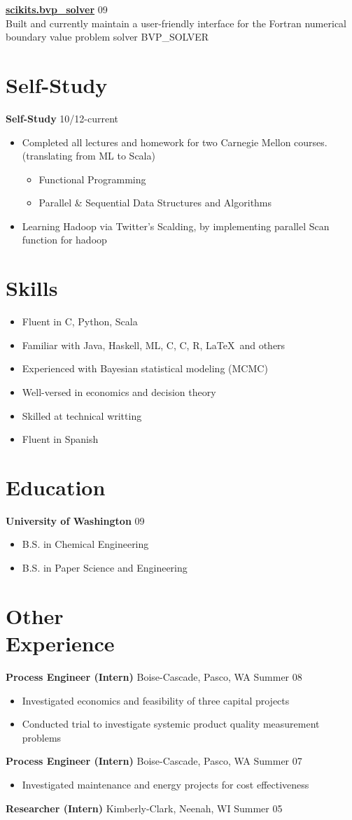 \documentclass[margin]{res}
\newcommand{\bactivity}[3]{
  {\bf #1} #2 \hfill #3
    \vspace{6pt}
    \begin{itemize} \itemsep -2pt
      }
\newcommand{\eactivity}[0]{\end{itemize}}
\newcommand{\bitem}{\begin{itemize} \itemsep -2pt}
\newcommand{\eitem}{\end{itemize} }
\newcommand{\CPP}
{C\nolinebreak[4]\hspace{-.05em}\raisebox{.22ex}{\footnotesize\bf ++}}
\newcommand{\CS}
{C\nolinebreak[4]\hspace{-.05em}\raisebox{.22ex}{\footnotesize\bf \#}}
\begin{document}
\begin{resume}
    {\bf \href{packages.python.org/scikits.bvp\_solver}{scikits.bvp\_solver}} \hfill  09\\
      Built and currently maintain a user-friendly interface for the Fortran numerical \\
      boundary value problem solver BVP\_SOLVER 

\section{Self-Study}
 \bactivity{Self-Study}{}{10/12-current}
      \item Completed all lectures and homework for two Carnegie Mellon courses.  (translating from ML to Scala)
      \bitem
        \item Functional Programming 
        \item Parallel \& Sequential Data Structures and Algorithms 
      \eitem
      \item Learning Hadoop via Twitter's Scalding, by implementing parallel Scan function for hadoop
    \eactivity

 
\section{Skills}
    \bitem
      \item Fluent in \CS, Python, Scala
      \item Familiar with Java, Haskell, ML, C, \CPP, R, \LaTeX\ and others
      \item Experienced with Bayesian statistical modeling (MCMC)
      \item Well-versed in economics and decision theory
      \item Skilled at technical writting
      \item Fluent in Spanish 
    \eitem

\section{Education} 
  \bactivity{University of Washington}{}{09}
      \item B.S. in Chemical Engineering
      \item B.S. in Paper Science and Engineering
  \eactivity
    
\section{Other \\ Experience}
    \bactivity{Process Engineer (Intern)}{Boise-Cascade, Pasco, WA}{Summer 08}
      \item Investigated economics and feasibility of three capital projects 
      \item Conducted trial to investigate systemic product quality measurement problems 
    \eactivity

    \bactivity{Process Engineer (Intern)}{Boise-Cascade, Pasco, WA}{Summer 07}
      \item Investigated maintenance and energy projects for cost effectiveness 
    \eactivity

    {\bf Researcher (Intern)} Kimberly-Clark, Neenah, WI \hfill  Summer 05

\end{resume} 
\end{document}

